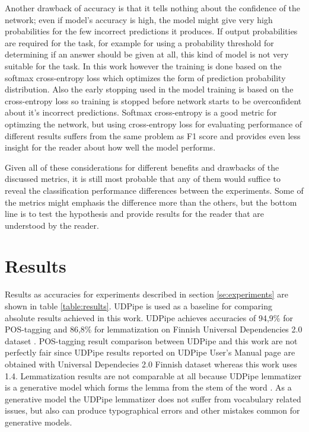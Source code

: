 \documentclass[12pt,a4paper,english
]{tutthesis}
\begin{document}
Another drawback of accuracy is that it tells nothing about the confidence of the network; even if model's accuracy is high, the model might give very high probabilities for the few incorrect predictions it produces. If output probabilities are required for the task, for example for using a probability threshold for determining if an answer should be given at all, this kind of model is not very suitable for the task. In this work however the training is done based on the softmax cross-entropy loss which optimizes the form of prediction probability distribution. Also the early stopping used in the model training is based on the cross-entropy loss so training is stopped before network starts to be overconfident about it's incorrect predictions. Softmax cross-entropy is a good metric for optimzing the network, but using cross-entropy loss for evaluating performance of different results suffers from the same problem as F1 score and provides even less insight for the reader about how well the model performs.

Given all of these considerations for different benefits and drawbacks of the discussed metrics, it is still most probable that any of them would suffice to reveal the classification performance differences between the experiments. Some of the metrics might emphasis the difference more than the others, but the bottom line is to test the hypothesis and provide results for the reader that are understood by the reader.

\section{Results}
\label{se:results}
Results as accuracies for experiments described in section \ref{se:experiments} are shown in table \ref{table:results}. UDPipe is used as a baseline for comparing absolute results achieved in this work. UDPipe achieves accuracies of 94,9\% for POS-tagging and 86,8\% for lemmatization on Finnish Universal Dependencies 2.0 dataset \cite{udpipe-manual}. POS-tagging result comparison between UDPipe and this work are not perfectly fair since UDPipe results reported on UDPipe User's Manual page are obtained with Universal Dependecies 2.0 Finnish dataset whereas this work uses 1.4. Lemmatization results are not comparable at all because UDPipe lemmatizer is a generative model which forms the lemma from the stem of the word \cite{Straka2017}. As a generative model the UDPipe lemmatizer does not suffer from vocabulary related issues, but also can produce typographical errors and other mistakes common for generative models.
\end{document}
